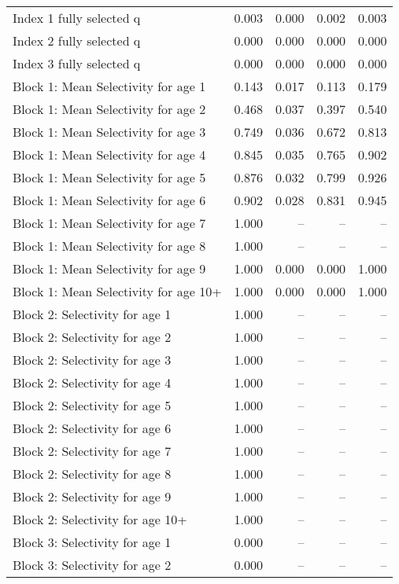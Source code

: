 \documentclass[
]{article}
\begin{document}
\begin{landscape}
\begin{longtable}[t]{lrrrr}
\endfoot
\bottomrule
\endlastfoot
Index 1 fully selected q & 0.003 & 0.000 & 0.002 & 0.003\\
Index 2 fully selected q & 0.000 & 0.000 & 0.000 & 0.000\\
Index 3 fully selected q & 0.000 & 0.000 & 0.000 & 0.000\\
Block 1: Mean Selectivity for age 1 & 0.143 & 0.017 & 0.113 & 0.179\\
Block 1: Mean Selectivity for age 2 & 0.468 & 0.037 & 0.397 & 0.540\\
\addlinespace
Block 1: Mean Selectivity for age 3 & 0.749 & 0.036 & 0.672 & 0.813\\
Block 1: Mean Selectivity for age 4 & 0.845 & 0.035 & 0.765 & 0.902\\
Block 1: Mean Selectivity for age 5 & 0.876 & 0.032 & 0.799 & 0.926\\
Block 1: Mean Selectivity for age 6 & 0.902 & 0.028 & 0.831 & 0.945\\
Block 1: Mean Selectivity for age 7 & 1.000 & -- & -- & --\\
\addlinespace
Block 1: Mean Selectivity for age 8 & 1.000 & -- & -- & --\\
Block 1: Mean Selectivity for age 9 & 1.000 & 0.000 & 0.000 & 1.000\\
Block 1: Mean Selectivity for age 10+ & 1.000 & 0.000 & 0.000 & 1.000\\
Block 2: Selectivity for age 1 & 1.000 & -- & -- & --\\
Block 2: Selectivity for age 2 & 1.000 & -- & -- & --\\
\addlinespace
Block 2: Selectivity for age 3 & 1.000 & -- & -- & --\\
Block 2: Selectivity for age 4 & 1.000 & -- & -- & --\\
Block 2: Selectivity for age 5 & 1.000 & -- & -- & --\\
Block 2: Selectivity for age 6 & 1.000 & -- & -- & --\\
Block 2: Selectivity for age 7 & 1.000 & -- & -- & --\\
\addlinespace
Block 2: Selectivity for age 8 & 1.000 & -- & -- & --\\
Block 2: Selectivity for age 9 & 1.000 & -- & -- & --\\
Block 2: Selectivity for age 10+ & 1.000 & -- & -- & --\\
Block 3: Selectivity for age 1 & 0.000 & -- & -- & --\\
Block 3: Selectivity for age 2 & 0.000 & -- & -- & --\\

\end{longtable}
\end{landscape}
\end{document}
